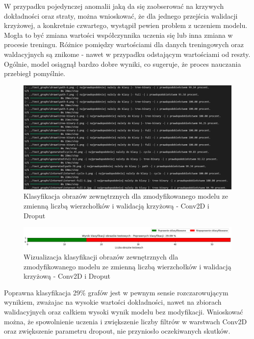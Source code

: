 W przypadku pojedynczej anomalii jaką da się zaobserować na krzywych dokładności oraz straty,
można wnioskować, że dla jednego przejścia walidacji krzyżowej, a konkretnie czwartego, wystąpił pewien problem z uczeniem modelu.
Mogła to być zmiana wartości współczynnika uczenia się lub inna zmiana w procesie treningu.
Różnice pomiędzy wartościami dla danych treningowych oraz waldacyjnych są znikome - nawet w przypadku odstającym wartościami od reszty.
Ogólnie, model osiągnął bardzo dobre wyniki, co sugeruje, że proces nauczania przebiegł pomyślnie.

\begin{figure}[ht]
	\centering
	\includegraphics[width=14cm]{resources/tests/images/v4/multiple_edges_crossvalid_1_txt.png}
	\caption{Klasyfikacja obrazów zewnętrznych dla zmodyfikowanego modelu ze zmienną liczbą wierzchołków i walidacją krzyżową - Conv2D i Droput}
	\label{Fig:tests-csvar-1b}
\end{figure}
\FloatBarrier

\begin{figure}[ht]
	\centering
	\includegraphics[width=14cm]{resources/tests/images/v4/multiple_edges_crossvalid_1_bar.png}
	\caption{Wizualizacja klasyfikacji obrazów zewnętrznych dla zmodyfikowanego modelu ze zmienną liczbą wierzchołków i walidacją krzyżową - Conv2D i Droput}
	\label{Fig:tests-csvar-1c}
\end{figure}
\FloatBarrier

Poprawna klasyfikacja 29\% grafów jest w pewnym sensie rozczarowującym wynikiem,
zważajac na wysokie wartości dokładności, nawet na zbiorach walidacyjnych
oraz całkiem wysoki wynik modelu bez modyfikacji.
Wnioskować można, że spowolnienie uczenia i zwiększenie liczby filtrów w warstwach Conv2D oraz zwiększenie parametru dropout,
nie przyniosło oczekiwanych skutków.

